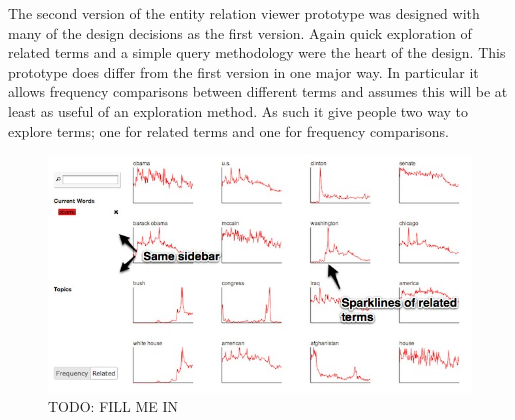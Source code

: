 The second version of the entity relation viewer prototype was designed with many of the design decisions as the first version. Again quick exploration of related terms and a simple query  methodology were the heart of the design. This prototype does differ from the first version in one major way. In particular it allows frequency comparisons between different terms and assumes this will be at least as useful of an exploration method. As such it give people two way to explore terms; one for related terms and one for frequency comparisons.


\begin{figure}[htb]
  \centerline{
    \includegraphics[scale=0.28]{figures/relation-1-b.jpg}
  }
  \caption{TODO: FILL ME IN}
  \label{fig:explorer-1-b}
\end{figure}
